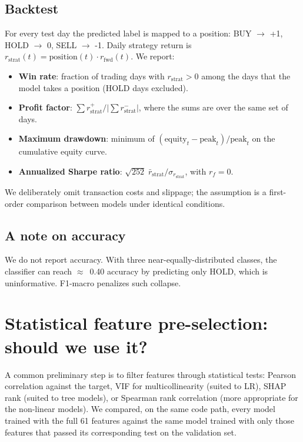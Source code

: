 \documentclass[runningheads]{llncs}
\begin{document}
\subsection{Backtest}
For every test day the predicted label is mapped to a position: BUY $\to$ +1, HOLD $\to$ 0, SELL $\to$ -1. Daily strategy return is $r_{\text{strat}}(t) = \text{position}(t)\cdot r_{\text{fwd}}(t)$. We report:
\begin{itemize}
\item \textbf{Win rate}: fraction of trading days with $r_{\text{strat}} > 0$ among the days that the model takes a position (HOLD days excluded).
\item \textbf{Profit factor}: $\sum r_{\text{strat}}^{+} / |\sum r_{\text{strat}}^{-}|$, where the sums are over the same set of days.
\item \textbf{Maximum drawdown}: minimum of $(\text{equity}_t - \text{peak}_t)/\text{peak}_t$ on the cumulative equity curve.
\item \textbf{Annualized Sharpe ratio}: $\sqrt{252}\;\bar r_{\text{strat}}/\sigma_{r_{\text{strat}}}$, with $r_f = 0$.
\end{itemize}
We deliberately omit transaction costs and slippage; the assumption is a first-order comparison between models under identical conditions.

\subsection{A note on accuracy}
We do not report accuracy. With three near-equally-distributed classes, the classifier can reach $\approx$~0.40 accuracy by predicting only HOLD, which is uninformative. F1-macro penalizes such collapse.

\section{Statistical feature pre-selection: should we use it?}
\label{sec:featselect}

A common preliminary step is to filter features through statistical tests: Pearson correlation against the target, VIF for multicollinearity (suited to LR), SHAP rank (suited to tree models), or Spearman rank correlation (more appropriate for the non-linear models). We compared, on the same code path, every model trained with the full 61 features against the same model trained with only those features that passed its corresponding test on the validation set.
\end{document}

